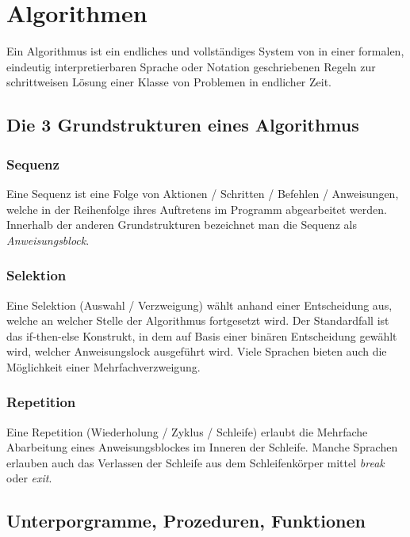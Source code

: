 \documentclass{article}
\begin{document}
\section{Algorithmen}

Ein Algorithmus ist ein endliches und vollständiges System von in einer formalen, eindeutig interpretierbaren
Sprache oder Notation geschriebenen Regeln zur schrittweisen Lösung einer Klasse von Problemen in endlicher
Zeit.

\subsection*{Die 3 Grundstrukturen eines Algorithmus}

\subsubsection*{Sequenz}

Eine Sequenz ist eine Folge von Aktionen / Schritten / Befehlen / Anweisungen, welche in der Reihenfolge ihres Auftretens im Programm
abgearbeitet werden.
Innerhalb der anderen Grundstrukturen bezeichnet man die Sequenz als \emph{Anweisungsblock}.

\subsubsection*{Selektion}

Eine Selektion (Auswahl / Verzweigung) wählt anhand einer Entscheidung aus, welche an welcher Stelle der Algorithmus fortgesetzt wird.
Der Standardfall ist das if-then-else Konstrukt, in dem auf Basis einer binären Entscheidung gewählt wird, welcher
Anweisungslock ausgeführt wird.
Viele Sprachen bieten auch die Möglichkeit einer Mehrfachverzweigung.

\subsubsection*{Repetition}

Eine Repetition (Wiederholung / Zyklus / Schleife) erlaubt die Mehrfache Abarbeitung eines Anweisungsblockes im Inneren der Schleife.
Manche Sprachen erlauben auch das Verlassen der Schleife aus dem Schleifenkörper mittel \emph{break} oder \emph{exit}.

\subsection*{Unterporgramme, Prozeduren, Funktionen}
\end{document}
